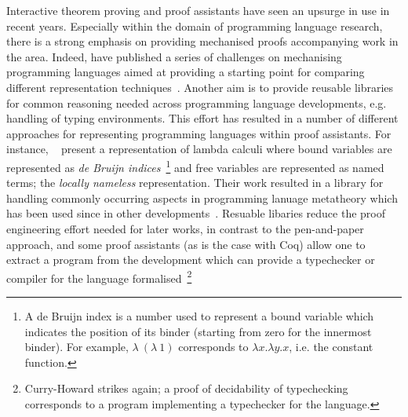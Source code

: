 \documentclass{mprop}
\begin{document}
Interactive theorem proving and proof assistants have seen an upsurge in use in recent years. Especially within the domain of programming language research, there is a strong emphasis on providing mechanised proofs accompanying work in the area. Indeed, \citeauthor{Aydemir:2005:MMM} have published a series of challenges on mechanising programming languages aimed at providing a starting point for comparing different representation techniques~\cite{Aydemir:2005:MMM}. Another aim is to provide reusable libraries for common reasoning needed across programming language developments, e.g. handling of typing environments. This effort has resulted in a number of different approaches for representing programming languages within proof assistants. For instance, \citeauthor{Aydemir:2008:EFM}~\cite{Aydemir:2008:EFM} present a representation of lambda calculi where bound variables are represented as \textit{de Bruijn indices}~\footnote{A de Bruijn index is a number used to represent a bound variable which indicates the position of its binder (starting from zero for the innermost binder). For example, $\lambda~(\lambda~1)$ corresponds to $\lambda x. \lambda y. x$, i.e. the constant function.} and free variables are represented as named terms; the \textit{locally nameless} representation. Their work resulted in a library for handling commonly occurring aspects in programming lanuage metatheory which has been used since in other developments~\cite{Park:2014:MMW}. Resuable libaries reduce the proof engineering effort needed for later works, in contrast to the pen-and-paper approach, and some proof assistants (as is the case with Coq) allow one to extract a program from the development which can provide a typechecker or compiler for the language formalised~\footnote{Curry-Howard strikes again; a proof of decidability of typechecking corresponds to a program implementing a typechecker for the language.}
\end{document}
